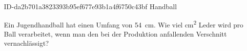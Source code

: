 \begin{exercise}
      {ID-da2b701a3823393b95ef677e93b1a4f6750c43bf}
      {Handball}
  \ifproblem\problem\par
    Ein Jugendhandball hat einen Umfang von
    \SI{54}{\centi\metre}.
    Wie viel \si{\square\centi\metre} Leder
    wird pro Ball verarbeitet, wenn man den
    bei der Produktion anfallenden Verschnitt
    vernachlässigt?
  \fi
\end{exercise}
